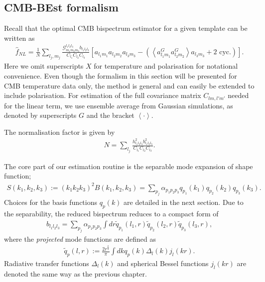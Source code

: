 \subsection{CMB-BEst formalism}
Recall that the optimal CMB bispectrum estimator for a given template can be written as
\begin{align}
	\hat{f}_{NL} = \frac{1}{N} \sum_{l_j,m_j} \frac{\mathcal{G}^{l_1 l_2 l_3}_{m_1 m_2 m_3} b_{l_1 l_2 l_3}}{C_{l_1} C_{l_2} C_{l_3}} \left[ a_{l_1 m_1} a_{l_2 m_2} a_{l_3 m_3} - \left( \left< a^G_{l_1 m_1} a^G_{l_2 m_2} \right> a_{l_3 m_3} + \text{2\ cyc.} \right)  \right].		\label{eqn:bispectrum_estimator_standard}
\end{align}
Here we omit superscripts $X$ for temperature and polarisation for notational convenience. Even though the formalism in this section will be presented for CMB temperature data only, the method is general and can easily be extended to include polarisation. For estimation of the full covariance matrix $C_{lm,l'm'}$ needed for the linear term, we use ensemble average from Gaussian simulations, as denoted by superscripts $G$ and the bracket $\left<\cdot\right>$.

The normalisation factor is given by
\begin{align}
	N = \sum_{l_j} \frac{h_{l_1 l_2 l_3}^2 b_{l_1 l_2 l_3}^2}{C_{l_1} C_{l_2} C_{l_3}}.
\end{align}

The core part of our estimation routine is the separable mode expansion of shape function;
\begin{align}
	S(k_1, k_2, k_3) := (k_1 k_2 k_3)^2 B(k_1, k_2, k_3) = \sum_{p_j} \alpha_{p_1 p_2 p_3} q_{p_1}(k_1) q_{p_2}(k_2) q_{p_3}(k_3).
\end{align}
Choices for the basis functions $q_p(k)$ are detailed in the next section. Due to the separability, the reduced bispectrum reduces to a compact form of
\begin{align}
	b_{l_1 l_2 l_3} = \sum_{p_j} \alpha_{p_1 p_2 p_3} \int dr \tilde{q}_{p_1}(l_1,r) \tilde{q}_{p_2}(l_2,r) \tilde{q}_{p_3}(l_3,r),
\end{align}
where the \textit{projected} mode functions are defined as
\begin{align}
	\tilde{q}_{p}(l,r) := \frac{2r^\frac{2}{3}}{\pi} \int dk q_p(k) \Delta_l(k) j_l (kr).
\end{align}
Radiative transfer functions $\Delta_l(k)$ and spherical Bessel functions $j_l(kr)$ are denoted the same way as the previous chapter.

